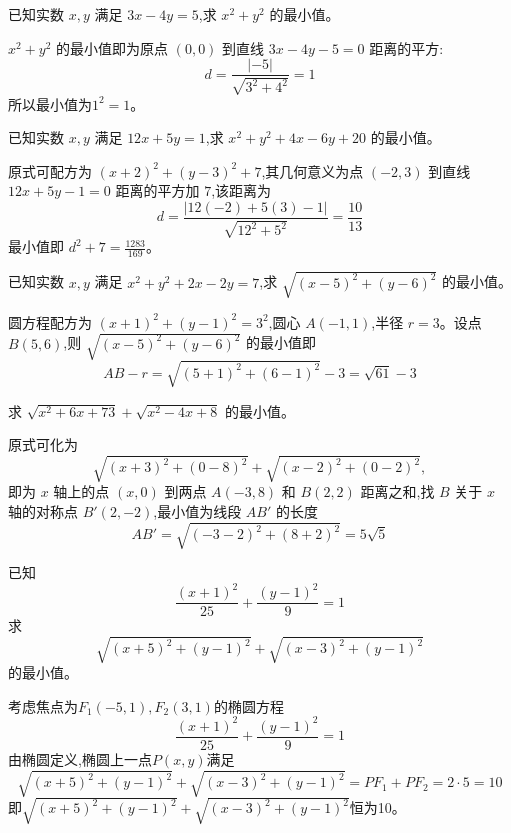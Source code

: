 \begin{questions}
    \question 已知实数 $x, y$ 满足 $3x - 4y = 5$,求 $x^2 + y^2$ 的最小值。
    \begin{solution}
        $x^2 + y^2$ 的最小值即为原点 $(0,0)$ 到直线 $3x - 4y - 5 = 0$ 距离的平方:
        \[ 
        d = \frac{|-5|}{\sqrt{3^2 + 4^2}} = 1 
        \]
        所以最小值为$1^2=1$。
    \end{solution}

    \question 已知实数 $x, y$ 满足 $12x + 5y = 1$,求 $x^2 + y^2 + 4x - 6y + 20$ 的最小值。
    \begin{solution}
        原式可配方为 $(x+2)^2 + (y-3)^2 + 7$,其几何意义为点 $(-2,3)$ 到直线 $12x + 5y - 1 = 0$ 距离的平方加 $7$,该距离为
        \[ 
        d = \frac{|12(-2) + 5(3) - 1|}{\sqrt{12^2 + 5^2}} = \frac{10}{13} 
        \]
        最小值即 $d^2 + 7 = \frac{1283}{169}$。
    \end{solution}

    \question 已知实数 $x, y$ 满足 $x^2 + y^2 + 2x - 2y = 7$,求 $\sqrt{(x-5)^2 + (y-6)^2}$ 的最小值。
    \begin{solution}
        圆方程配方为 $(x+1)^2 + (y-1)^2 = 3^2$,圆心 $A(-1,1)$,半径 $r=3$。设点 $B(5,6)$,则 $\sqrt{(x-5)^2 + (y-6)^2}$ 的最小值即
        \[ 
        AB - r= \sqrt{(5+1)^2 + (6-1)^2} - 3 = \sqrt{61} - 3 
        \]
    \end{solution}

    \question 求 $\sqrt{x^2+6x+73} + \sqrt{x^2-4x+8}$ 的最小值。
    \begin{solution}
        原式可化为 
        \[
        \sqrt{(x+3)^2 + (0-8)^2} + \sqrt{(x-2)^2 + (0-2)^2},
        \]
        即为 $x$ 轴上的点 $(x,0)$ 到两点 $A(-3,8)$ 和 $B(2,2)$ 距离之和,找 $B$ 关于 $x$ 轴的对称点 $B'(2,-2)$,最小值为线段 $AB'$ 的长度
        \[ 
        AB' = \sqrt{(-3-2)^2 + (8+2)^2} = 5\sqrt{5} 
        \]
    \end{solution}

    \question 已知
    \[
    \frac{(x+1)^{2}}{25}+\frac{(y-1)^{2}}{9}=1
    \]
    求
    \[
    \sqrt{(x+5)^{2}+(y-1)^{2}}+\sqrt{(x-3)^{2}+(y-1)^{2}}
    \]
    的最小值。
    \begin{solution}
        考虑焦点为$F_1(-5,1),F_2(3,1)$的椭圆方程
        \[
        \frac{(x+1)^{2}}{25}+\frac{(y-1)^{2}}{9}=1
        \]
        由椭圆定义,椭圆上一点$P(x,y)$满足
        \[
        \sqrt{(x+5)^2 + (y-1)^2} + \sqrt{(x-3)^2 + (y-1)^2} = PF_1 + PF_2 = 2\cdot 5= 10
        \]
        即$\sqrt{(x+5)^2 + (y-1)^2} + \sqrt{(x-3)^2 + (y-1)^2}$恒为10。
    \end{solution}


\end{questions}

